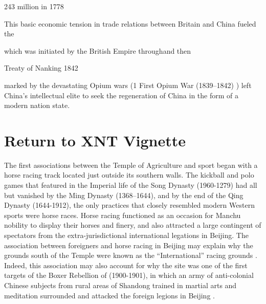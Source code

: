 {%







243 million in 1778

This basic economic tension in trade relations between Britain and China fueled the

 which was initiated by the British Empire throughand then

Treaty of Nanking 1842

marked by the devastating Opium wars (1 First Opium War (1839–1842) ) left China's intellectual elite to seek the regeneration of China in the form of a modern nation state.









\section{Return to XNT Vignette}
The first associations between the Temple of Agriculture and sport began with a horse racing track located just outside its southern walls.  The kickball and polo games that featured in the Imperial life of the Song Dynasty (1960-1279) had all but vanished by the Ming Dynasty (1368–1644), and by the end of the Qing Dynasty (1644-1912), the only practices that closely resembled modern Western sports were horse races.  Horse racing functioned as an occasion for Manchu nobility to display their horses and finery, and also attracted a large contingent of spectators from the extra-jurisdictional international legations in Beijing.  The association between foreigners and horse racing in Beijing may explain why the grounds south of the Temple were known as the ``International'' racing grounds \citep{Brownell2008}. Indeed, this association may also account for why the site was one of the first targets of the Boxer Rebellion of (1900-1901), in which an army of anti-colonial Chinese subjects from rural areas of Shandong trained in martial arts and meditation surrounded and attacked the foreign legions in Beijing \citep{Brownell2008}.

}

